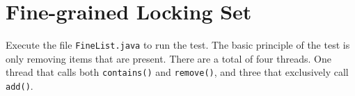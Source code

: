 \documentclass[12pt,letterpaper,titlepage]{article}
\begin{document}
%      
%      
%      
%    
  \section{Fine-grained Locking Set}
    Execute the file \texttt{FineList.java} to run the test. The basic principle of the test is only removing items that are present. There are a total of four threads. One thread that calls both \texttt{contains()} and \texttt{remove()}, and three that exclusively call \texttt{add()}.
    
\end{document}
